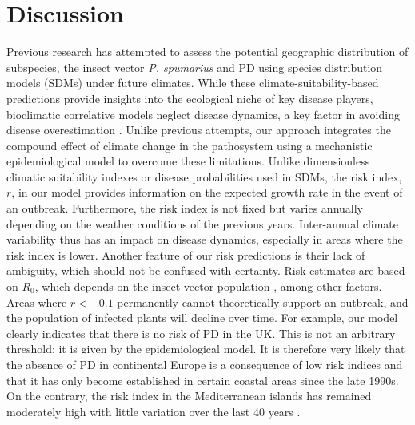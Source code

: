 \section{Discussion}

Previous research has attempted to assess the potential geographic
distribution of  \xf{} subspecies, the insect vector \textit{P. spumarius} and
PD using species distribution models (SDMs) under future climates. While these
climate-suitability-based predictions provide insights into the ecological
niche of key disease players, bioclimatic correlative models neglect disease
dynamics, a key factor in avoiding disease overestimation
\cite{GimenezRomero2022_CommsBio}. Unlike previous attempts, our approach
integrates
the compound effect of climate change in the pathosystem using a mechanistic
epidemiological model to overcome these limitations.  Unlike dimensionless
climatic suitability indexes or disease probabilities used in SDMs, the risk
index, $r$, in our model provides information on the expected growth rate in
the event of an outbreak. Furthermore, the risk index is not fixed but varies
annually depending on the weather conditions of the previous years.
Inter-annual climate variability thus has an impact on disease dynamics,
especially in areas where the risk index is lower.  Another feature of our risk
predictions is their lack of ambiguity, which should not be confused with
certainty. Risk estimates are based on $R_0$, which depends on the insect
vector population \cite{GimenezRomero2022_PRE}, among other factors. Areas
where
$r<-0.1$ permanently cannot theoretically support an outbreak, and the
population of infected plants will decline over time. For example, our model
clearly indicates that there is no risk of PD in the UK. This is not an
arbitrary threshold; it  is given by the epidemiological model.  It is
therefore very likely that the absence of PD in continental Europe is a
consequence of low risk indices and that it has only become established in
certain coastal areas since the late 1990s. On the contrary, the risk index in
the Mediterranean islands has remained moderately high with little variation
over the last 40 years \cite{GimenezRomero2022_CommsBio}.

